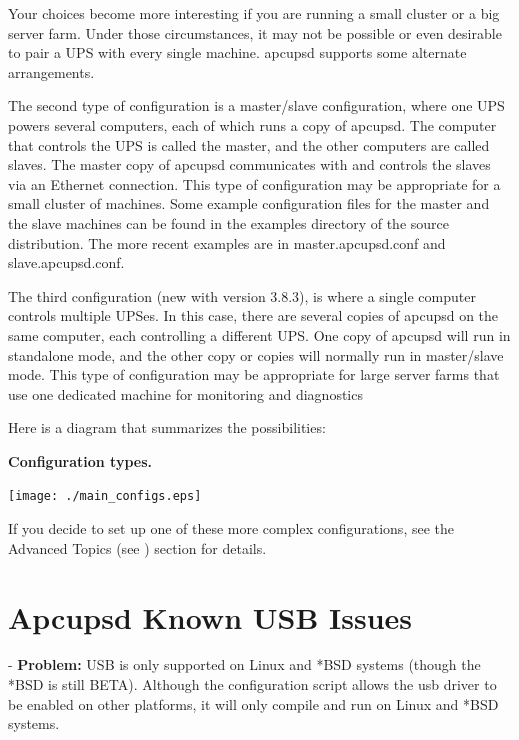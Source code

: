 Your choices become more interesting if you are running a small cluster or a
big server farm.  Under those circumstances, it may not be possible or even
desirable to pair a UPS with every single machine.  apcupsd supports some
alternate arrangements.  

The second type of configuration is a master/slave configuration, where one
UPS powers several computers, each of which runs a copy of apcupsd.  The
computer that controls the UPS is called the master, and the other computers
are called slaves.  The master copy of apcupsd communicates with and controls
the slaves via an Ethernet connection.  This type of configuration may be
appropriate for a small cluster of machines.  Some example configuration files
for the master and the slave machines can be found in the examples directory
of the source distribution.  The more recent examples are in
master.apcupsd.conf and slave.apcupsd.conf.  

The third configuration (new with version 3.8.3), is where a single computer
controls multiple UPSes. In this case, there are several copies of apcupsd on
the same computer, each controlling a different UPS. One copy of apcupsd will
run in standalone mode, and the other copy or copies will normally run in
master/slave mode.  This type of configuration may be appropriate for large
server farms that use one dedicated machine for monitoring and diagnostics  

Here is a diagram that summarizes the possibilities: 

\label{Configuration-types_005f}

{\bf Configuration types.}  

\texttt{[image: ./main\_configs.eps]}

If you decide to set up one of these more complex configurations, see the
Advanced Topics (see 
) section for details. 

\label{Apcupsd-Known-USB-Issues}

\section*{Apcupsd Known USB Issues}

\label{index-USB-problems-15}
\label{index-Problems_002c-USB-16}
- {\bf Problem:} USB is only supported on Linux and *BSD systems (though the
*BSD is still BETA). Although the configuration script allows the usb driver
to be enabled on other platforms, it will only compile and run on Linux and
*BSD systems.  

